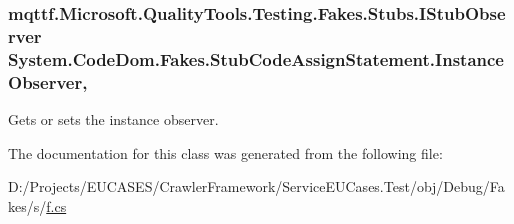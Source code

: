 \hypertarget{class_system_1_1_code_dom_1_1_fakes_1_1_stub_code_assign_statement_ab84efa9c1d36c4640d08b82662c15bd8}{
\subsubsection[{Instance\-Observer}]{\setlength{\rightskip}{0pt plus 5cm}mqttf.\-Microsoft.\-Quality\-Tools.\-Testing.\-Fakes.\-Stubs.\-I\-Stub\-Observer System.\-Code\-Dom.\-Fakes.\-Stub\-Code\-Assign\-Statement.\-Instance\-Observer\hspace{0.3cm}{\ttfamily [get]}, {\ttfamily [set]}}}\label{class_system_1_1_code_dom_1_1_fakes_1_1_stub_code_assign_statement_ab84efa9c1d36c4640d08b82662c15bd8}


Gets or sets the instance observer.



The documentation for this class was generated from the following file\-:\begin{DoxyCompactItemize}
\item 
D\-:/\-Projects/\-E\-U\-C\-A\-S\-E\-S/\-Crawler\-Framework/\-Service\-E\-U\-Cases.\-Test/obj/\-Debug/\-Fakes/s/\hyperlink{s_2f_8cs}{f.\-cs}\end{DoxyCompactItemize}
